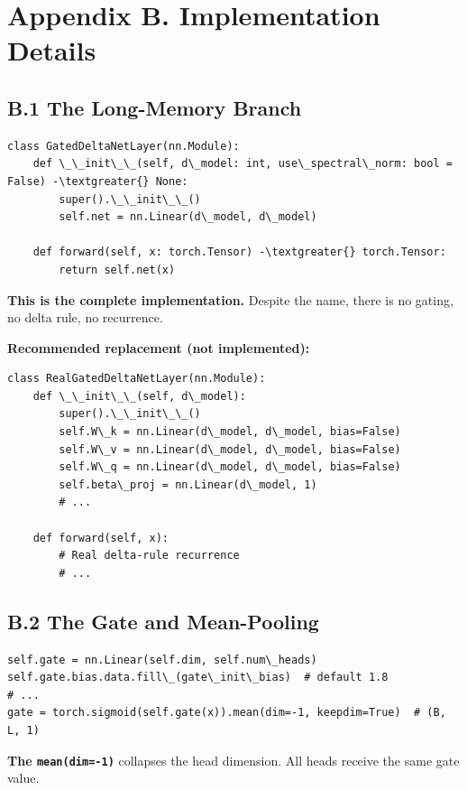
\section{Appendix B. Implementation Details}

\subsection{B.1 The Long-Memory Branch}

\begin{lstlisting}
class GatedDeltaNetLayer(nn.Module):
    def \_\_init\_\_(self, d\_model: int, use\_spectral\_norm: bool = False) -\textgreater{} None:
        super().\_\_init\_\_()
        self.net = nn.Linear(d\_model, d\_model)

    def forward(self, x: torch.Tensor) -\textgreater{} torch.Tensor:
        return self.net(x)
\end{lstlisting}

\textbf{This is the complete implementation.} Despite the name, there is no 
gating, no delta rule, no recurrence.

\textbf{Recommended replacement (not implemented):}

\begin{lstlisting}
class RealGatedDeltaNetLayer(nn.Module):
    def \_\_init\_\_(self, d\_model):
        super().\_\_init\_\_()
        self.W\_k = nn.Linear(d\_model, d\_model, bias=False)
        self.W\_v = nn.Linear(d\_model, d\_model, bias=False)
        self.W\_q = nn.Linear(d\_model, d\_model, bias=False)
        self.beta\_proj = nn.Linear(d\_model, 1)
        # ...

    def forward(self, x):
        # Real delta-rule recurrence
        # ...
\end{lstlisting}

\subsection{B.2 The Gate and Mean-Pooling}

\begin{lstlisting}
self.gate = nn.Linear(self.dim, self.num\_heads)
self.gate.bias.data.fill\_(gate\_init\_bias)  # default 1.8
# ...
gate = torch.sigmoid(self.gate(x)).mean(dim=-1, keepdim=True)  # (B, L, 1)
\end{lstlisting}

\textbf{The \texttt{mean(dim=-1)}} collapses the head dimension. All heads receive the 
same gate value.

